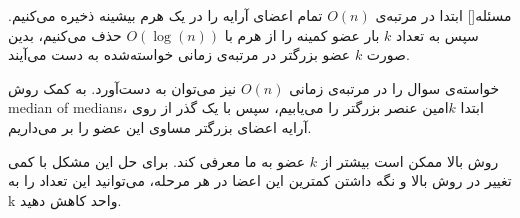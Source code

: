 
‌مسئله[]
ابتدا در مرتبه‌ی $O(n)$ تمام اعضای آرایه را در یک هرم بیشینه ذخیره می‌کنیم. سپس به تعداد $k$ بار عضو کمینه را از هرم با
 $O(\log(n))$ 
 حذف می‌کنیم، بدین صورت $k$ عضو بزرگتر در مرتبه‌ی زمانی خواسته‌شده به دست می‌آیند.
 
خواسته‌ی سوال را در مرتبه‌ی زمانی $O(n)$ نیز می‌توان به دست‌آورد. به کمک روش median of medians، ابتدا $k$امین عنصر بزرگتر را می‌یابیم، سپس با یک گذر از روی آرایه اعضای بزرگتر مساوی این عضو را بر می‌داریم.

روش بالا ممکن است بیشتر از $k$ عضو به ما معرفی کند. برای حل این مشکل با کمی تغییر در روش بالا و نگه داشتن کمترین این اعضا در هر مرحله، می‌توانید این تعداد را به k واحد کاهش دهید.












